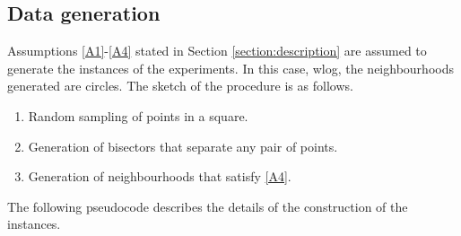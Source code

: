 \documentclass[a4paper,  review, authoryear, 1p.]{elsarticle}
\newcommand{\CV}[1]{{\color{blue}#1}}
\begin{document}
		
		\subsection{Data generation}\label{subsection:datageneration}
		Assumptions \ref{A1}-\ref{A4} stated in Section \ref{section:description} are assumed to generate the instances of the experiments. In this case, \CV{wlog}, the neighbourhoods generated are circles. The sketch of the procedure is as follows. 
		
		\begin{enumerate}
			\item Random sampling of points in a square.
			\item Generation of bisectors that separate any pair of points.
			\item Generation of neighbourhoods that satisfy \ref{A4}.
		\end{enumerate}
		
		The following pseudocode describes the details of the construction of the instances.
		
\end{document}
